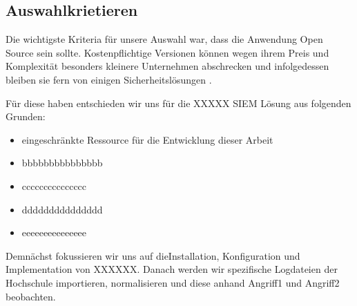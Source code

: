 \subsection{Auswahlkrietieren}
Die wichtigste Kriteria für unsere Auswahl war, dass die Anwendung \gls{Open Source} sein sollte. Kostenpflichtige Versionen können wegen ihrem Preis und Komplexität besonders kleinere Unternehmen abschrecken und infolgedessen bleiben sie fern von einigen Sicherheitslösungen \citep{Bjork_OSSIEM}.

Für diese haben entschieden wir uns für die XXXXX \gls{SIEM} Lösung aus folgenden Grunden:

\begin{itemize}[noitemsep]
   \item eingeschränkte Ressource für die Entwicklung dieser Arbeit
   \item bbbbbbbbbbbbbbb
   \item ccccccccccccccc
   \item ddddddddddddddd
   \item eeeeeeeeeeeeeee
\end{itemize}

Demnächst fokussieren wir uns auf dieInstallation, Konfiguration und Implementation von XXXXXX. Danach werden wir spezifische Logdateien der Hochschule importieren, normalisieren und diese anhand Angriff1 und Angriff2 beobachten.